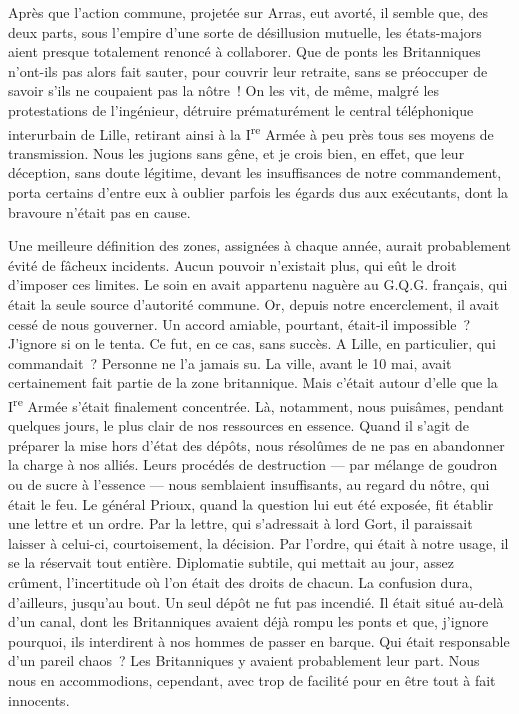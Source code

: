 \documentclass[french,twoside]{book} %
\begin{document}
Après que l’action commune, projetée sur Arras, eut avorté, il semble que, des deux parts, sous l’empire d’une sorte de désillusion mutuelle, les états-majors aient presque totalement renoncé à collaborer. Que de ponts les Britanniques n’ont-ils pas alors fait sauter, pour couvrir leur retraite, sans se préoccuper de savoir s’ils ne coupaient pas la nôtre ! On les vit, de même, malgré les protestations de l’ingénieur, détruire prématurément le central téléphonique interurbain de Lille, retirant ainsi à la I\textsuperscript{re} Armée à peu près tous ses moyens de transmission. Nous les jugions sans gêne, et je crois bien, en effet, que leur déception, sans doute légitime, devant les insuffisances de notre commandement, porta certains d’entre eux à oublier parfois les égards dus aux exécutants, dont la bravoure n’était pas en cause.\par
Une meilleure définition des zones, assignées à chaque année, aurait probablement évité de fâcheux incidents. Aucun pouvoir n’existait plus, qui eût le droit d’imposer ces limites. Le soin en avait appartenu naguère au G.Q.G. français, qui était la seule source d’autorité commune. Or, depuis notre encerclement, il avait cessé de nous gouverner. Un accord amiable, pourtant, était-il impossible ? J’ignore si on le tenta. Ce fut, en ce cas, sans succès. A Lille, en particulier, qui commandait ? Personne ne l’a jamais su. La ville, avant le 10 mai, avait certainement fait partie de la zone britannique. Mais c’était autour d’elle que la I\textsuperscript{re} Armée s’était finalement concentrée. Là, notamment, nous puisâmes, pendant quelques jours, le plus clair de nos ressources en essence. Quand il s’agit de préparer la mise hors d’état des dépôts, nous résolûmes de ne pas en   abandonner la charge à nos alliés. Leurs procédés de destruction — par mélange de goudron ou de sucre à l’essence — nous semblaient insuffisants, au regard du nôtre, qui était le feu. Le général Prioux, quand la question lui eut été exposée, fit établir une lettre et un ordre. Par la lettre, qui s’adressait à lord Gort, il paraissait laisser à celui-ci, courtoisement, la décision. Par l’ordre, qui était à notre usage, il se la réservait tout entière. Diplomatie subtile, qui mettait au jour, assez crûment, l’incertitude où l’on était des droits de chacun. La confusion dura, d’ailleurs, jusqu’au bout. Un seul dépôt ne fut pas incendié. Il était situé au-delà d’un canal, dont les Britanniques avaient déjà rompu les ponts et que, j’ignore pourquoi, ils interdirent à nos hommes de passer en barque. Qui était responsable d’un pareil chaos ? Les Britanniques y avaient probablement leur part. Nous nous en accommodions, cependant, avec trop de facilité pour en être tout à fait innocents.\par
\end{document}
